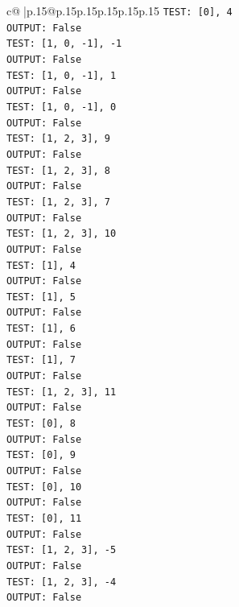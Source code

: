 \documentclass{article}
\begin{document}
{\begin{supertabular}{c@{$\;$}|p{.15\linewidth}@{}p{.15\linewidth}p{.15\linewidth}p{.15\linewidth}p{.15\linewidth}p{.15\linewidth}}
{{{\texttt{TEST: {[}0{]}, 4} \\
\texttt{OUTPUT: False} \\
\texttt{TEST: {[}1, 0, {-}1{]}, {-}1} \\
\texttt{OUTPUT: False} \\
\texttt{TEST: {[}1, 0, {-}1{]}, 1} \\
\texttt{OUTPUT: False} \\
\texttt{TEST: {[}1, 0, {-}1{]}, 0} \\
\texttt{OUTPUT: False} \\
\texttt{TEST: {[}1, 2, 3{]}, 9} \\
\texttt{OUTPUT: False} \\
\texttt{TEST: {[}1, 2, 3{]}, 8} \\
\texttt{OUTPUT: False} \\
\texttt{TEST: {[}1, 2, 3{]}, 7} \\
\texttt{OUTPUT: False} \\
\texttt{TEST: {[}1, 2, 3{]}, 10} \\
\texttt{OUTPUT: False} \\
\texttt{TEST: {[}1{]}, 4} \\
\texttt{OUTPUT: False} \\
\texttt{TEST: {[}1{]}, 5} \\
\texttt{OUTPUT: False} \\
\texttt{TEST: {[}1{]}, 6} \\
\texttt{OUTPUT: False} \\
\texttt{TEST: {[}1{]}, 7} \\
\texttt{OUTPUT: False} \\
\texttt{TEST: {[}1, 2, 3{]}, 11} \\
\texttt{OUTPUT: False} \\
\texttt{TEST: {[}0{]}, 8} \\
\texttt{OUTPUT: False} \\
\texttt{TEST: {[}0{]}, 9} \\
\texttt{OUTPUT: False} \\
\texttt{TEST: {[}0{]}, 10} \\
\texttt{OUTPUT: False} \\
\texttt{TEST: {[}0{]}, 11} \\
\texttt{OUTPUT: False} \\
\texttt{TEST: {[}1, 2, 3{]}, {-}5} \\
\texttt{OUTPUT: False} \\
\texttt{TEST: {[}1, 2, 3{]}, {-}4} \\
\texttt{OUTPUT: False} \\
}}}
\end{supertabular}}
\end{document}
